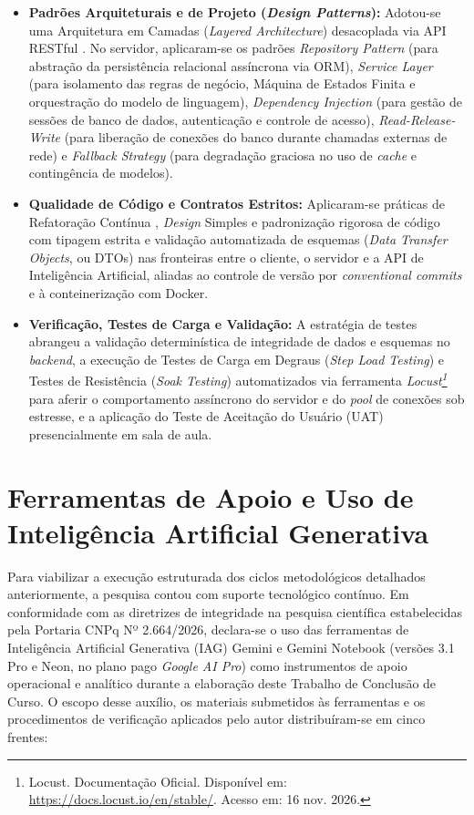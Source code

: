 \begin{itemize}
    \item \textbf{Padrões Arquiteturais e de Projeto (\textit{Design Patterns}):} Adotou-se uma Arquitetura em Camadas (\textit{Layered Architecture}) desacoplada via API RESTful \cite{pressman2021, martin2018}. No servidor, aplicaram-se os padrões \textit{Repository Pattern} (para abstração da persistência relacional assíncrona via ORM), \textit{Service Layer} \cite{fowler2002} (para isolamento das regras de negócio, Máquina de Estados Finita e orquestração do modelo de linguagem), \textit{Dependency Injection} (para gestão de sessões de banco de dados, autenticação e controle de acesso), \textit{Read-Release-Write} (para liberação de conexões do banco durante chamadas externas de rede) e \textit{Fallback Strategy} (para degradação graciosa no uso de \textit{cache} e contingência de modelos).
    \item \textbf{Qualidade de Código e Contratos Estritos:} Aplicaram-se práticas de Refatoração Contínua \cite{fowler2020}, \textit{Design} Simples e padronização rigorosa de código com tipagem estrita e validação automatizada de esquemas (\textit{Data Transfer Objects}, ou DTOs) nas fronteiras entre o cliente, o servidor e a API de Inteligência Artificial, aliadas ao controle de versão por \textit{conventional commits} e à conteinerização com Docker.
    \item \textbf{Verificação, Testes de Carga e Validação:} A estratégia de testes abrangeu a validação determinística de integridade de dados e esquemas no \textit{backend}, a execução de Testes de Carga em Degraus (\textit{Step Load Testing}) e Testes de Resistência (\textit{Soak Testing}) automatizados via ferramenta \textit{Locust\footnote{Locust. Documentação Oficial. Disponível em: \url{https://docs.locust.io/en/stable/}. Acesso em: 16 nov. 2026.}} para aferir o comportamento assíncrono do servidor e do \textit{pool} de conexões sob estresse, e a aplicação do Teste de Aceitação do Usuário (UAT) \cite{sommerville2016} presencialmente em sala de aula.
\end{itemize}

\section{Ferramentas de Apoio e Uso de Inteligência Artificial Generativa}
\label{sec:uso_ia}

Para viabilizar a execução estruturada dos ciclos metodológicos detalhados anteriormente, a pesquisa contou com suporte tecnológico contínuo. Em conformidade com as diretrizes de integridade na pesquisa científica estabelecidas pela Portaria CNPq Nº 2.664/2026, declara-se o uso das ferramentas de Inteligência Artificial Generativa (IAG) Gemini e Gemini Notebook (versões 3.1 Pro e Neon, no plano pago \textit{Google AI Pro}) como instrumentos de apoio operacional e analítico durante a elaboração deste Trabalho de Conclusão de Curso. O escopo desse auxílio, os materiais submetidos às ferramentas e os procedimentos de verificação aplicados pelo autor distribuíram-se em cinco frentes:

